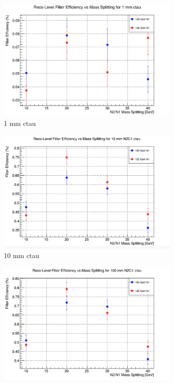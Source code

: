 \documentclass{article}
\begin{document}
\begin{figure} [H]
\begin{subfigure}{.5\textwidth}
  \centering
  \includegraphics[width=.8\linewidth]{1mmEff.png}  
  \caption{1 mm ctau}
  \label{fig:sub-first18}
\end{subfigure}
\begin{subfigure}{.5\textwidth}
  \centering
  \includegraphics[width=.8\linewidth]{10mmEff.png}  
  \caption{10 mm ctau}
  \label{fig:sub-second18}
\end{subfigure}
\begin{subfigure}{.5\textwidth}
  \centering
  \includegraphics[width=.8\linewidth]{100mmEff.png}  

\end{subfigure}
\end{figure}
\end{document}
